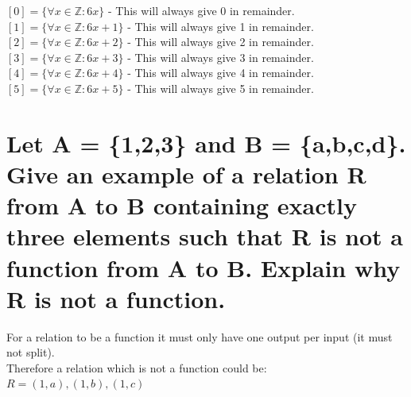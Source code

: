 \begin{center}
$[0]=\{\forall x\in \mathbb{Z}:6x\}$ - This will always give 0 in remainder.\\
$[1]=\{\forall x\in \mathbb{Z}:6x+1\}$ - This will always give 1 in remainder.\\
$[2]=\{\forall x\in \mathbb{Z}:6x+2\}$ - This will always give 2 in remainder.\\
$[3]=\{\forall x\in \mathbb{Z}:6x+3\}$ - This will always give 3 in remainder.\\
$[4]=\{\forall x\in \mathbb{Z}:6x+4\}$ - This will always give 4 in remainder.\\
$[5]=\{\forall x\in \mathbb{Z}:6x+5\}$ - This will always give 5 in remainder.\\
\end{center}

\newpage
\section{Let A = \{1,2,3\} and B = \{a,b,c,d\}. Give an example of a relation R from A to B containing exactly three elements such that R is not a function from A to B. Explain why R is not a function.}
For a relation to be a function it must only have one output per input (it must not split).\\
Therefore a relation which is not a function could be:\\
$R={(1,a),(1,b),(1,c)}$\\
\newpage
